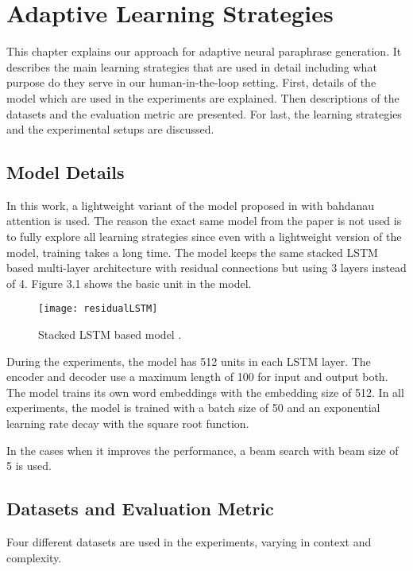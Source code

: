 \chapter{Adaptive Learning Strategies}\label{approach}

This chapter explains our approach for adaptive neural paraphrase generation. It describes the main learning strategies that are used in detail including what purpose do they serve in our human-in-the-loop setting. First, details of the model which are used in the experiments are explained. Then descriptions of the datasets and the evaluation metric are presented. For last, the learning strategies and the experimental setups are discussed.

\section{Model Details}

In this work, a lightweight variant of the model proposed in  \cite{Prakashetal} with bahdanau attention \cite{bahdanau} is used. The reason the exact same model from the paper is not used is to fully explore all learning strategies since even with a lightweight version of the model, training takes a long time. The model keeps the same stacked LSTM based multi-layer architecture with residual connections but using 3 layers instead of 4. Figure 3.1 shows the basic unit in the model.

\begin{figure}[t]
\texttt{[image: residualLSTM]}
\centering
\caption{Stacked LSTM based model \cite{Prakashetal}.}
\end{figure}

During the experiments, the model has 512 units in each LSTM layer. The encoder and decoder use a maximum length of 100 for input and output both. The model trains its own word embeddings with the embedding size of 512. In all experiments, the model is trained with a batch size of 50 and an exponential learning rate decay with the square root function.

In the cases when it improves the performance, a beam search with beam size of 5 is used.

\section{Datasets and Evaluation Metric}

Four different datasets are used in the experiments, varying in context and complexity. 

